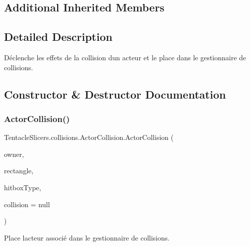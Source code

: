 \subsection*{Additional Inherited Members}


\subsection{Detailed Description}
Déclenche les effets de la collision d\textquotesingle{}un acteur et le place dans le gestionnaire de collisions. 



\subsection{Constructor \& Destructor Documentation}
\mbox{\label{class_tentacle_slicers_1_1collisions_1_1_actor_collision_afe57c1bade07db8e5d75fc7486dc6439}} 
\subsubsection{\texorpdfstring{Actor\+Collision()}{ActorCollision()}\hspace{0.1cm}{\footnotesize\ttfamily [1/2]}}
{\footnotesize\ttfamily Tentacle\+Slicers.\+collisions.\+Actor\+Collision.\+Actor\+Collision (\begin{DoxyParamCaption}\item[{\hyperlink{class_tentacle_slicers_1_1actors_1_1_actor}{Actor}}]{owner,  }\item[{\hyperlink{class_tentacle_slicers_1_1collisions_1_1_rectangle}{Rectangle}}]{rectangle,  }\item[{\hyperlink{namespace_tentacle_slicers_1_1collisions_aa7fd5cb9caf0a56384804b6bc00a6f0e}{Hitbox\+Type}}]{hitbox\+Type,  }\item[{Action$<$ \hyperlink{class_tentacle_slicers_1_1actors_1_1_actor}{Actor} $>$}]{collision = {\ttfamily null} }\end{DoxyParamCaption})}



Place l\textquotesingle{}acteur associé dans le gestionnaire de collisions. 


